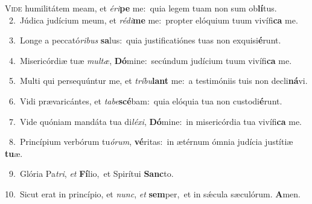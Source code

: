 \lettrine{\initial\textcolor{\initialcolor}{V}}{ide} humilitátem meam, et \textit{é}\-\textit{ri}\textbf{pe} me:~\star quia legem tuam non sum ob\-\textbf{lí}\-tus.\\
{\numbfont\textcolor{\numbcolor}{~2.}}~Júdica judícium meum, et \textit{réd}\-\textit{i}\textbf{me} me:~\star propter elóquium tuum vivífi\textbf{ca} me.\par
{\numbfont\textcolor{\numbcolor}{~3.}}~Longe a peccató\-\textit{ri}\-\textit{bus} \textbf{sa}\-lus:~\star quia justificatiónes tuas non exquisi\-\textbf{é}\-runt.\par
{\numbfont\textcolor{\numbcolor}{~4.}}~Misericórdiæ tuæ \textit{mul}\-\textit{tæ}, \textbf{Dó}\-mine:~\star secúndum judícium tuum vivífi\textbf{ca} me.\par
{\numbfont\textcolor{\numbcolor}{~5.}}~Multi qui persequúntur me, et \textit{trí}\-\textit{bu}\textbf{lant} me:~\star a testimóniis tuis non decli\-\textbf{ná}\-vi.\par
{\numbfont\textcolor{\numbcolor}{~6.}}~Vidi prævaricántes, et \textit{ta}\-\textit{be}\textbf{scé}bam:~\star quia elóquia tua non custodi\-\textbf{é}\-runt.\par
{\numbfont\textcolor{\numbcolor}{~7.}}~Vide quóniam mandáta tua di\-\textit{lé}\-\textit{xi}, \textbf{Dó}\-mine:~\star in misericórdia tua vivífi\textbf{ca} me.\par
{\numbfont\textcolor{\numbcolor}{~8.}}~Princípium verbórum tu\-\textit{ó}\-\textit{rum}, \textbf{vé}\-ritas:~\star in ætérnum ómnia judícia justítiæ \textbf{tu}\-æ.\par
{\numbfont\textcolor{\numbcolor}{~9.}}~Glória Pa\-\textit{tri}\-, \textit{et} \textbf{Fí}\-lio,~\star et Spirítui \textbf{Sanc}\-to.\par
{\numbfont\textcolor{\numbcolor}{10.}}~Sicut erat in princípio, et \textit{nunc}\-, \textit{et} \textbf{sem}\-per,~\star et in sǽcula sæculórum. \textbf{A}\-men.\par
